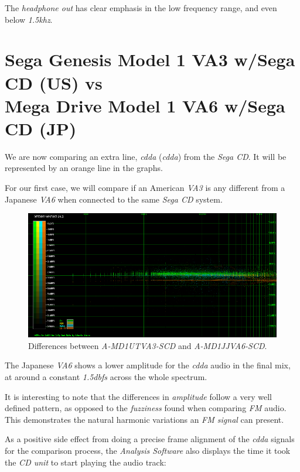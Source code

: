 \documentclass[10pt,a4paper]{report}
\newcommand{\define}[1]{\textit{\acrlong{#1}} (\textit{\acrshort{#1}})}
\newcommand{\ac}[1]{\textit{\mbox{\acrshort{#1}}}}
\newcommand{\khz}[1]{\textit{\mbox{#1\acrshort{khz}}}}
\newcommand{\db}[1]{\textit{\mbox{#1\acrshort{dbfs}}}}
\begin{document}
The \textit{headphone out} has clear emphasis in the low frequency range, and even below \khz{1.5}.

\section{Sega Genesis Model 1 VA3 w/Sega CD (US) vs\\ Mega Drive Model 1 VA6 w/Sega CD (JP)}
\label{signaldefinition}

We are now comparing an extra line, \define{cdda} from the \textit{Sega CD}. It will be represented by an orange line in the graphs.

For our first case, we will compare if an American \textit{VA3} is any different from a Japanese \textit{VA6} when connected to the same \textit{Sega CD} system.

\begin{figure}[H]
	\centering
	\includegraphics[width=1.0\linewidth]{images/results/10-A-MD1UTVA3-SCD-LA_vs_A-MD1JJVA6-SCD.png}
	\caption[A-MD1UTVA3-SCD-LA vs A-MD1JJVA6-SCD]{Differences between  \textit{A-MD1UTVA3-SCD} and \textit{A-MD1JJVA6-SCD}.}
	\label{fig:A-MD1UTVA3-SCD-LA_vs_A-MD1JJVA6-SCD}
\end{figure}

The Japanese \textit{VA6} shows a lower amplitude for the \ac{cdda} audio in the final mix, at around a constant \db{1.5} across the whole spectrum.

It is interesting to note that the differences in \textit{amplitude} follow a very well defined pattern, as opposed to the \textit{fuzziness} found when comparing \textit{FM} audio. This demonstrates the natural harmonic variations an \textit{FM signal} can present.

As a positive side effect from doing a precise frame alignment of the \ac{cdda} signals for the comparison process, the \textit{Analysis Software} also displays the time it took the \textit{CD unit} to start playing the audio track:
\end{document}
